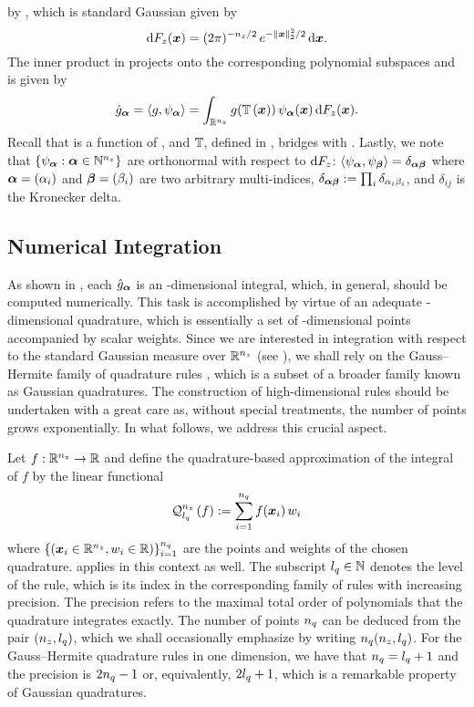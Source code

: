 by \vz, which is standard Gaussian given by
\[
  \d F_\z(\v{x}) = (2 \pi)^{-\nz/2} \, e^{-\norm[2]{\v{x}}^2 / 2} \, \d \v{x}.
\]
The inner product in  projects \g onto the
corresponding polynomial subspaces and is given by
\[
  \hat{\g}_{\multiindex}
  = \innerproduct{\g}{\psi_{\multiindex}}
  = \int_{\real^\nz} \g(\transform{\v{x}}) \, \psi_{\multiindex}(\v{x}) \, \d F_\z(\v{x}).
\]
Recall that \g is a function of \vu, and $\transform$, defined in
, bridges \vu with \vz. Lastly, we note that
$\{ \psi_{\multiindex}: \multiindex \in \natural^\nz \}$ are orthonormal with
respect to $\d F_\z$:
$\innerproduct{\psi_{\multiindex}}{\psi_{\multiindex[\beta]}} =
\delta_{\multiindex \multiindex[\beta]}$ where $\multiindex = (\alpha_i)$ and
$\multiindex[\beta] = (\beta_i)$ are two arbitrary multi-indices,
$\delta_{\multiindex \multiindex[\beta]} := \prod_i \delta_{\alpha_i \beta_i}$,
and $\delta_{ij}$ is the Kronecker delta.

\subsection{Numerical Integration}

As shown in , each $\hat{\g}_{\multiindex}$ is an
\nz-dimensional integral, which, in general, should be computed numerically.
This task is accomplished by virtue of an adequate \nz-dimensional quadrature,
which is essentially a set of \nz-dimensional points accompanied by scalar
weights. Since we are interested in integration with respect to the standard
Gaussian measure over $\real^\nz$ (see ), we
shall rely on the Gauss--Hermite family of quadrature rules \cite{maitre2010},
which is a subset of a broader family known as Gaussian quadratures. The
construction of high-dimensional rules should be undertaken with a great care
as, without special treatments, the number of points grows exponentially. In
what follows, we address this crucial aspect.

Let $f: \real^\nz \to \real$ and define the quadrature-based approximation of
the integral of $f$ by the linear functional
\[
  \quadrature{\nz}{\lq}{f} := \sum_{i = 1}^\nq f(\v{x}_i) \, w_i
\]
where $\{ (\v{x}_i \in \real^\nz, w_i \in \real) \}_{i = 1}^\nq$ are the points
and weights of the chosen quadrature.  applies in this
context as well. The subscript $\lq \in \natural$ denotes the level of the rule,
which is its index in the corresponding family of rules with increasing
precision. The precision refers to the maximal total order of polynomials that
the quadrature integrates exactly. The number of points $\nq$ can be deduced
from the pair $(\nz, \lq)$, which we shall occasionally emphasize by writing
$\nq(\nz, \lq)$. For the Gauss--Hermite quadrature rules in one dimension, we
have that $\nq = \lq + 1$ and the precision is $2 \nq - 1$ \cite{heiss2008} or,
equivalently, $2 \lq + 1$, which is a remarkable property of Gaussian
quadratures.

